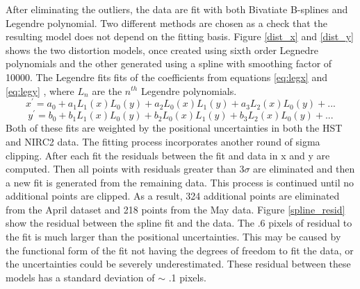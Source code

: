 After eliminating the outliers, the data are fit with both Bivatiate B-splines and Legendre polynomial.  Two different methods are chosen as a check that the resulting model does not depend on the fitting basis.  Figure \ref{dist_x} and \ref{dist_y} shows the two distortion models, once created using sixth order Legnedre polynomials and the other generated using a spline with smoothing factor of 10000.  The Legendre fits fits of the coefficients from equations \ref{eq:legx} and \ref{eq:legy} , where $L_{n}$ are the $n^{th}$ Legendre polynomials.  
\begin{equation}
x^{'} = a_{0} + a_{1}L_{1}(x)L_{0}(y) +  a_{2}L_{0}(x)L_{1}(y) + a_{3}L_{2}(x)L_{0}(y)+...
\label{eq:legx}
\end{equation}
\begin{equation}
y^{'} = b_{0} + b_{1}L_{1}(x)L_{0}(y) +  b_{2}L_{0}(x)L_{1}(y) + b_{3}L_{2}(x)L_{0}(y)+...
\label{eq:legy}
\end{equation}
Both of these fits are weighted by the positional uncertainties in both the HST and NIRC2 data.  The fitting process incorporates another round of sigma clipping.  After each fit the residuals between the fit and data in x and y are computed.  Then all points with residuals greater than $3\sigma$ are eliminated and then a new fit is generated from the remaining data.  This process is continued until no additional points are clipped.  As a result, 324 additional points are eliminated from the April dataset and 218 points from the May data.   Figure \ref{spline_resid} show the residual between the spline fit and the data.  The .6 pixels of residual to the fit is much larger than the positional uncertainties.  This may be caused by the functional form of the fit not having the degrees of freedom to fit the data, or the uncertainties could be severely underestimated.   These residual between these models has a standard deviation of $\sim$ .1 pixels.
